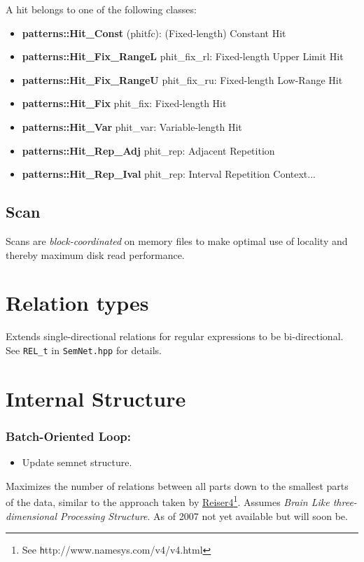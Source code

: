 \documentclass[a4paper,10pt,twocolumn]{article}
\newcommand{\codeC}[1]{\lstset{language=C}\lstinline!#1!}
\newcommand{\codeREL}[1]{\lstset{language=C++}\lstinline!REL_#1!}
\newcommand{\hrefn}[2]{\href{#1}{#2}\footnote{See {\texttt #1}}} %
\begin{document}
A hit belongs to one of the following classes:
\begin{itemize}
\item \textbf{patterns::Hit_Const} (phitfc): (Fixed-length) Constant Hit
\item \textbf{patterns::Hit_Fix_RangeL} phit_fix_rl: Fixed-length Upper Limit Hit
\item \textbf{patterns::Hit_Fix_RangeU} phit_fix_ru: Fixed-length Low-Range Hit
\item \textbf{patterns::Hit_Fix} phit_fix: Fixed-length Hit
\item \textbf{patterns::Hit_Var} phit_var: Variable-length Hit
\item \textbf{patterns::Hit_Rep_Adj} phit_rep: Adjacent Repetition
\item \textbf{patterns::Hit_Rep_Ival} phit_rep: Interval Repetition Context...
\end{itemize}

\subsection{Scan}

Scans are \emph{block-coordinated} on memory files to make optimal use of
locality and thereby maximum disk read performance.

\section{Relation types}

Extends single-directional relations for regular expressions to be
bi-directional. See \codeREL{t} in \codeC{SemNet.hpp} for details.

\section{Internal Structure}

\subsubsection{Batch-Oriented Loop:}

\begin{itemize}
\item Update semnet structure.
\end{itemize}
Maximizes the number of relations between all parts down to the smallest parts
of the data, similar to the approach taken by
\hrefn{http://www.namesys.com/v4/v4.html}{Reiser4}.  Assumes \emph{Brain Like
  three-dimensional Processing Structure}. As of 2007 not yet available but will
soon be.
\end{document}
